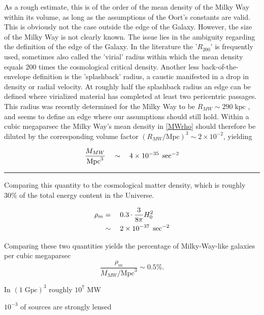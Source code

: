 %
As a rough estimate, this is of the order of the mean density of the Milky Way
within its volume, as long as the assumptions of the Oort's constants are valid.
This is obviously not the case outside the edge of the Galaxy. However, the size
of the Milky Way is not clearly known.  The issue lies in the ambiguity
regarding the definition of the edge of the Galaxy.  In the literature the
'$R_{200}$' is frequently used, sometimes also called the 'virial' radius within
which the mean density equals 200 times the cosmological critical density.
Another less back-of-the-envelope definition is the 'splashback' radius, a
caustic manifested in a drop in density or radial velocity.  At roughly half the
splashback radius an edge can be defined where virialized material has completed
at least two pericentric passages.  This radius was recently determined for the
Milky Way to be $R_{MW} \sim 290\;\mathrm{kpc}$ , and seems
to define an edge where our assumptions should still hold.  Within a cubic
megaparsec the Milky Way's mean density in \eqref{MWrho} should therefore be
diluted by the corresponding volume factor $(R_{MW} / \mathrm{Mpc})^{3} \sim 2
\times 10^{-2}$, yielding

\begin{equation}\eqlbl{MWperMpc}
    \frac{M_{MW}}{\mathrm{Mpc}^{3}} \quad\sim\quad 4 \times 10^{-35}\;\sec^{-2}
\end{equation}

\par\noindent\rule{\textwidth}{0.8pt}

Comparing this quantity to the cosmological matter density, which is roughly
30\% of the total energy content in the Universe.

\begin{equation}
    \begin{aligned}
        \rho_{m} &=\quad 0.3\cdot\frac{3}{8\pi}H_{0}^{2} \\
                 &\sim\quad 2 \times 10^{-37}\;\sec^{-2}
    \end{aligned}
\end{equation}

Comparing these two quantities yields the percentage of Milky-Way-like galaxies
per cubic megaparsec
\begin{equation}
    \frac{\rho_m}{M_{MW}/\mathrm{Mpc}^{3}} \sim 0.5\%.
\end{equation}

In $(1\;\mathrm{Gpc})^{3}$ roughly $10^7$ MW

$10^{-3}$ of sources are strongly lensed